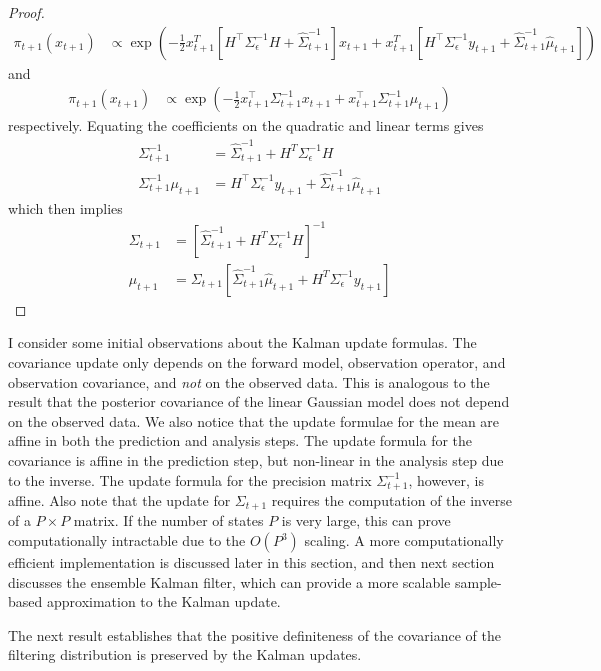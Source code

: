 \documentclass[12pt]{article}
\begin{document}
\begin{proof}
\begin{align*}
\pi_{t + 1}(x_{t + 1}) &\propto \exp\left(-\frac{1}{2} x_{t+1}^T\left[H^\top \Sigma_{\epsilon}^{-1}H + \hat{\Sigma}_{t+1}^{-1} \right] x_{t+1} + x_{t+1}^T \left[H^\top \Sigma_{\epsilon}^{-1}y_{t+1} + \hat{\Sigma}_{t+1}^{-1}\hat{\mu}_{t+1} \right] \right)
\end{align*}
and 
\begin{align*}
\pi_{t + 1}(x_{t + 1}) &\propto \exp\left(-\frac{1}{2} x_{t + 1}^\top \Sigma_{t+1}^{-1} x_{t+1} + x_{t+1}^\top \Sigma_{t+1}^{-1} \mu_{t+1} \right)
\end{align*}
respectively. Equating the coefficients on the quadratic and linear terms gives
\begin{align*}
\Sigma_{t + 1}^{-1} &= \hat{\Sigma}_{t+1}^{-1} + H^T \Sigma_{\epsilon}^{-1} H \\
\Sigma_{t+1}^{-1} \mu_{t+1} &= H^\top \Sigma_{\epsilon}^{-1}y_{t+1} + \hat{\Sigma}_{t+1}^{-1}\hat{\mu}_{t+1}
\end{align*}
which then implies
\begin{align*}
\Sigma_{t+1} &= \left[\hat{\Sigma}_{t+1}^{-1} + H^T \Sigma_{\epsilon}^{-1} H \right]^{-1} \\
\mu_{t + 1} &= \Sigma_{t+1} \left[\hat{\Sigma}_{t+1}^{-1}\hat{\mu}_{t+1} + H^T \Sigma_{\epsilon}^{-1}y_{t+1} \right]
\end{align*}
\end{proof}
I consider some initial observations about the Kalman update formulas. The covariance update only depends on the forward model, 
observation operator, and observation covariance, and \textit{not} on the observed data. This is analogous to the result that the 
posterior covariance of the linear Gaussian model does not depend on the observed data. We also notice that the update formulae 
for the mean are affine in both the prediction and analysis steps. The update formula for the covariance is affine in the prediction 
step, but non-linear in the analysis step due to the inverse. The update formula for the precision matrix $\Sigma_{t+1}^{-1}$, however, 
is affine. Also note that the update for $\Sigma_{t+1}$ requires the computation of the inverse of a $P \times P$ matrix. If the number of 
states $P$ is very large, this can prove computationally intractable due to the $O(P^3)$ scaling. A more computationally efficient implementation 
is discussed later in this section, and then next section discusses the ensemble Kalman filter, which can provide a more scalable sample-based 
approximation to the Kalman update. 

The next result establishes that the positive definiteness of the covariance of the filtering distribution is preserved by the Kalman updates. 
\end{document}
